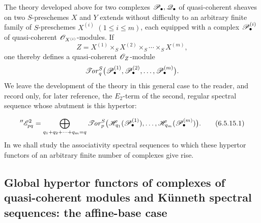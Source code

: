 \begin{env}[6.5.15]
\label{III.6.5.15}
The theory developed above for two complexes
$\mathscr{P}_\bullet,\mathscr{Q}_\bullet$ of quasi-coherent sheaves on two
$S$-preschemes $X$ and $Y$ extends without difficulty to an
arbitrary finite family of $S$-preschemes $X^{(i)}$
$(1\leq i\leq m)$, each equipped with a complex
$\mathscr{P}_\bullet^{(i)}$ of quasi-coherent
$\mathscr{O}_{X^{(i)}}$-modules.  If
\[
  Z=X^{(1)}\times_SX^{(2)}\times_S\cdots\times_SX^{(m)},
\]
one thereby defines a quasi-coherent $\mathscr{O}_Z$-module
\[
  \mathscr{T}\!\mathit{or}_q^S
  \bigl(\mathscr{P}_\bullet^{(1)},\mathscr{P}_\bullet^{(2)},\ldots,
        \mathscr{P}_\bullet^{(m)}\bigr).
\]
We leave the development of the theory in this general case to
the reader, and record only, for later reference, the $E_2$-term
of the second, regular spectral sequence whose abutment is this
hypertor:


\[
  ''\mathscr{E}_{pq}^2
  =
  \bigoplus_{q_1+q_2+\cdots+q_m=q}
  \mathscr{T}\!\mathit{or}_p^S
  \bigl(
    \mathscr{H}_{q_1}(\mathscr{P}_\bullet^{(1)}),\ldots,
    \mathscr{H}_{q_m}(\mathscr{P}_\bullet^{(m)})
  \bigr).
  \tag{6.5.15.1}\label{III.6.5.15.1}
\]
In  we shall study the associativity spectral
sequences to which these hypertor functors of an arbitrary
finite number of complexes give rise.
\end{env}

\subsection{Global hypertor functors of complexes of
quasi-coherent modules and K\"unneth spectral sequences: the
affine-base case}
\label{subsection:III.6.6}

